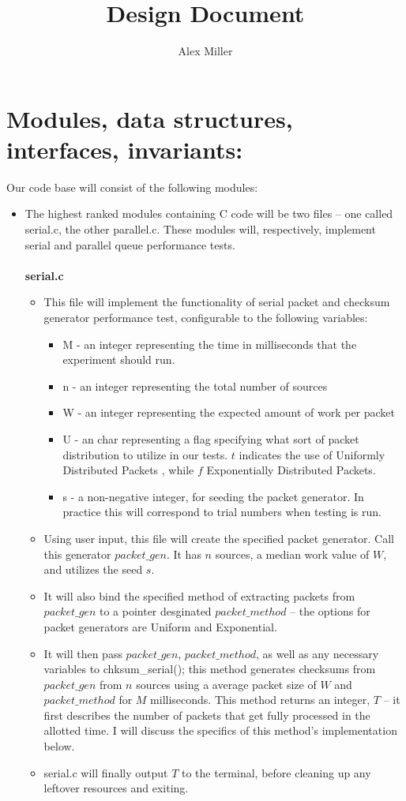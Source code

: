 \documentclass[]{article}
\title{Design Document}
\author{Alex Miller}
\begin{document}
	\maketitle
	

\section{Modules, data structures, interfaces, invariants:}
Our code base will consist of the following modules:
\begin{itemize}
	\item The highest ranked modules containing C code will be two files -- one called serial.c, the other parallel.c. These modules will, respectively, implement serial and parallel queue performance tests.
	\\\\
	\textbf{serial.c}
	\begin{itemize}
		\item This file will implement the functionality of serial packet and checksum generator performance test, configurable to the following variables:
		\begin{itemize}
			\item M - an integer representing the time in milliseconds that the experiment should run.
			\item n - an integer representing the total number of sources 
			\item W - an integer representing the expected amount of work per packet
			\item U - an char representing a flag specifying what sort of packet distribution to utilize in our tests. $t$ indicates the use of Uniformly Distributed Packets , while $f$ Exponentially Distributed Packets.
			\item s - a non-negative integer, for seeding the packet generator. In practice this will correspond to trial numbers when testing is run.
		\end{itemize}
		\item Using user input, this file will create the specified packet generator. Call this generator $packet\_gen$. It has $n$ sources, a median work value of $W$, and utilizes the seed $s$. 
		\item It will also bind the specified method of extracting packets from $packet\_gen$ to a pointer desginated $packet\_method$ -- the options for packet generators are Uniform and Exponential. 
		\item It will then pass $packet\_gen$, $packet\_method$, as well as any necessary variables to chksum\_serial(); this method generates checksums from $packet\_gen$ from $n$ sources using a average packet size of $W$ and $packet\_method$ for $M$ milliseconds. This method returns an integer, $T$ -- it first describes the number of packets that get fully processed in the allotted time. I will discuss the specifics of this method's implementation below. 
		\item serial.c will finally output $T$ to the terminal, before cleaning up any leftover resources and exiting.
	\end{itemize}
	

\end{itemize}
\end{document}
